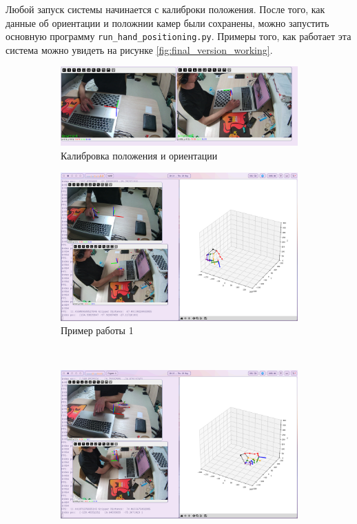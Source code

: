 \documentclass[12pt, a4paper]{article}
\begin{document}
Любой запуск системы начинается с калиброки положения. После того, как данные
об ориентации и положнии камер были сохранены, можно запустить основную
программу \texttt{run\_hand\_positioning.py}. Примеры того, как работает эта
система можно увидеть на рисунке \ref{fig:final_version_working}.
\begin{figure}[!ht]
\centering
    \begin{subfigure}{0.45\textwidth}
      \centering
      \includegraphics[width=\linewidth]{images/final_version_working/orientation_calibration.png}
      \caption{Калибровка положения и ориентации}
    \end{subfigure}
    \hfill
    \begin{subfigure}{0.45\textwidth}
      \centering
      \includegraphics[width=\linewidth]{images/final_version_working/pose-1.png}
      \caption{Пример работы 1}
    \end{subfigure}
    \\
    \begin{subfigure}{0.45\textwidth}
      \centering
      \includegraphics[width=\linewidth]{images/final_version_working/pose-2.png}

\end{subfigure}
\end{figure}
\end{document}
